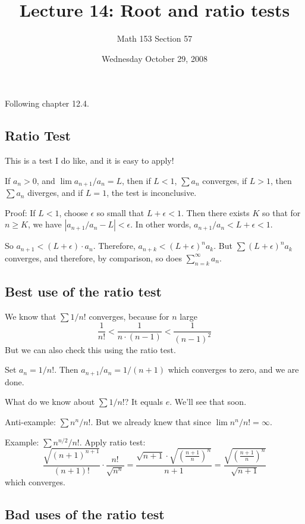 \documentclass[12pt]{article}
\title{Lecture 14: Root and ratio tests}
\author{Math 153 Section 57}
\date{Wednesday October 29, 2008}
\begin{document}
\maketitle

Following chapter 12.4.

\subsection*{Ratio Test}

This is a test I do like, and it is easy to apply!

If $a_n > 0$, and $\lim a_{n+1}/a_n = L$, then if $L < 1$, $\sum a_n$
converges, if $L > 1$, then $\sum a_n$ diverges, and if $L = 1$, the
test is inconclusive.

Proof: If $L < 1$, choose $\epsilon$ so small that $L + \epsilon < 1$.  Then there exists $K$ so that for $n \geq K$, we have $| a_{n+1}/a_n - L | < \epsilon$.  In other words, $a_{n+1} / a_n < L + \epsilon < 1$.

So $a_{n+1} < (L + \epsilon) \cdot a_n$.  Therefore, $a_{n+k} < (L +
\epsilon)^n {a_k}$.  But $\sum (L + \epsilon)^n a_k$ converges, and
therefore, by comparison, so does $\sum_{n=k}^\infty a_n$.

\subsection{Best use of the ratio test}

We know that $\sum 1/n!$ converges, because for $n$ large
$$
\frac{1}{n!} < \frac{1}{n \cdot (n-1)} < \frac{1}{(n-1)^2}
$$
But we can also check this using the ratio test.

Set $a_n = 1/n!$.  Then $a_{n+1}/a_n = 1/(n+1)$ which converges to
zero, and we are done.

What do we know about $\sum 1/n!$?  It equals $e$.  We'll see that soon.

Anti-example: $\sum n^{n}/n!$.  But we already knew that since $\lim n^{n}/n! = \infty$.

Example: $\sum n^{n/2}/n!$.  Apply ratio test:
$$
\frac{\sqrt{(n+1)^{n+1}}}{(n+1)!} \cdot \frac{n!}{\sqrt{n^n}} =
\frac{\sqrt{n+1} \cdot \sqrt{(\frac{n+1}{n})^n}}{n+1} = 
\frac{\sqrt{(\frac{n+1}{n})^n}}{\sqrt{n+1}}
$$
which converges.

\subsection{Bad uses of the ratio test}
\end{document}
